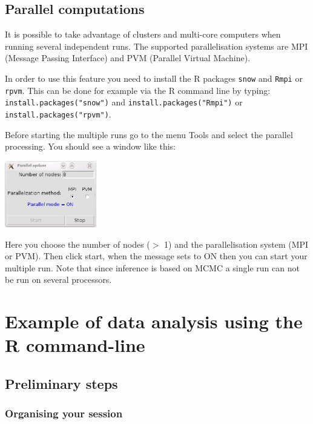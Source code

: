 \documentclass[a4paper,10pt]{article}
\begin{document}
\subsection{Parallel computations}

It is possible to take advantage of clusters and multi-core computers when running several independent runs. 
The supported parallelisation systems are MPI (Message Passing Interface) and PVM (Parallel Virtual Machine).

In order to use this feature you need to install the  R packages \texttt{snow} and \texttt{Rmpi} or \texttt{rpvm}.
This can be done for example via the  R command line by typing:
\texttt{install.packages("snow")}  and  
\texttt{install.packages("Rmpi")} 
or
\texttt{install.packages("rpvm")}.

Before starting the multiple runs go to the menu Tools and select the parallel processing. You should see a window like this:

\centerline{\includegraphics[width=4cm]{./fig/parallel.jpg}}

Here you choose the number of nodes ($>$ 1) and the parallelisation system (MPI or PVM). 
Then click start, when the message sets to ON then you can start your multiple run. 
Note that since inference is based on MCMC a  single run can not be run on several processors.

\clearpage
\section[Examples with the command-line]{Example of data analysis using the R command-line}


  
\subsection{Preliminary steps}

\subsubsection{Organising your session}
\end{document}
